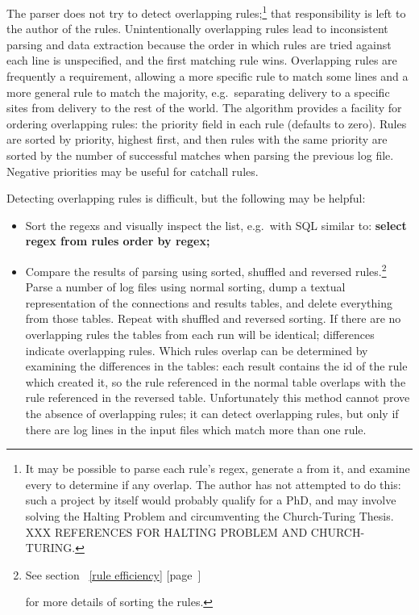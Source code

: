 \documentclass[a4paper,12pt,draft]{article}
\newcommand{\refwithpage}[1]{%
    \empty{}\ref{#1} [page~\pageref{#1}]%
}
\begin{document}
The parser does not try to detect overlapping rules;\footnote{It may be
possible to parse each rule's regex, generate a \DFA{} from it, and examine
every \DFA{} to determine if any overlap.  The author has not attempted to
do this: such a project by itself would probably qualify for a PhD, and may
involve solving the Halting Problem and circumventing the Church-Turing
Thesis.  XXX REFERENCES FOR HALTING PROBLEM AND CHURCH-TURING\@.} that
responsibility is left to the author of the rules.  Unintentionally
overlapping rules lead to inconsistent parsing and data extraction because
the order in which rules are tried against each line is unspecified, and
the first matching rule wins.  Overlapping rules are frequently a
requirement, allowing a more specific rule to match some lines and a more
general rule to match the majority, e.g.\ separating \SMTP{} delivery to a
specific sites from \SMTP{} delivery to the rest of the world.  The
algorithm provides a facility for ordering overlapping rules: the priority
field in each rule (defaults to zero).  Rules are sorted by priority,
highest first, and then rules with the same priority are sorted by the
number of successful matches when parsing the previous log file.  Negative
priorities may be useful for catchall rules.

Detecting overlapping rules is difficult, but the following may be helpful:

\begin{itemize}

    \item Sort the regexs and visually inspect the list, e.g.\ with SQL
        similar to: \textbf{select regex from rules order by regex;}

    \item Compare the results of parsing using sorted, shuffled and
        reversed rules.\footnote{See section~\refwithpage{rule efficiency}
        for more details of sorting the rules.}  Parse a number of log
        files using normal sorting, dump a textual representation of the
        connections and results tables, and delete everything from those
        tables.  Repeat with shuffled and reversed sorting.  If there are
        no overlapping rules the tables from each run will be identical;
        differences indicate overlapping rules.  Which rules overlap can be
        determined by examining the differences in the tables: each result
        contains the id of the rule which created it, so the rule
        referenced in the normal table overlaps with the rule referenced in
        the reversed table.  Unfortunately this method cannot prove the
        absence of overlapping rules; it can detect overlapping rules, but
        only if there are log lines in the input files which match more
        than one rule.

\end{itemize}
\end{document}
